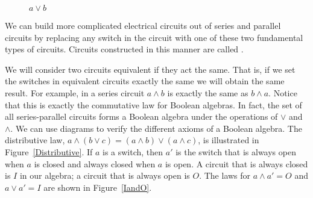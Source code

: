 \begin{figure}[htb]
\begin{center}
\end{center}
\caption{$a \vee b$}
\label{Parallel}
\end{figure}
 
 
We can build more complicated electrical circuits out of series and
parallel circuits by replacing any switch in the circuit with one of
these two fundamental types of circuits. Circuits constructed in this
manner are called . 
 
 
 
We will consider two circuits equivalent if they act the same.
That is, if we set the switches in equivalent circuits exactly the
same we will obtain the same result.  For example, in a series circuit
$a \wedge b$ is exactly the same as $b \wedge a$.  Notice that this is
exactly the commutative law for Boolean algebras. In fact, the set of
all series-parallel circuits forms a Boolean algebra under the
operations of $\vee$ and $\wedge$. We can use diagrams to verify the
different axioms of a Boolean algebra. The distributive law, $a
\wedge ( b \vee c ) = (a \wedge b ) \vee ( a \wedge c )$,  is
illustrated in Figure~\ref{Distributive}. 
If $a$ is a switch, then $a'$ is the switch that is always open when
$a$ is closed and always closed when $a$ is open. A circuit that is
always closed is $I$ in our algebra; a circuit that is always
open is $O$. The laws for $a \wedge a' = O$ and $a \vee
a' = I$ are shown in Figure~\ref{IandO}.  




